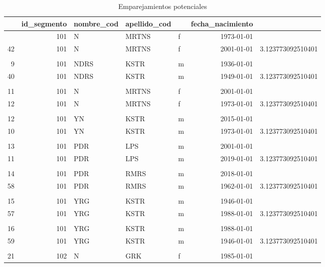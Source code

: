 \documentclass[
  12pt,
]{book}
\begin{document}
\begin{table}[t]
\caption*{
{\fontsize{20}{25}\selectfont  Emparejamientos potenciales\fontsize{12}{15}\selectfont }
} 
\fontsize{12.0pt}{14.0pt}\selectfont
\begin{tabular*}{1\linewidth}{@{\extracolsep{\fill}}rrlllrr}
\toprule
{\bfseries \cellcolor[HTML]{F9F9F9}{id}} & id\_segmento & nombre\_cod & apellido\_cod & {\bfseries \cellcolor[HTML]{F9F9F9}{sexo}} & fecha\_nacimiento & {\bfseries \cellcolor[HTML]{F9F9F9}{Weight}} \\ 
\midrule\addlinespace[2.5pt]
 6 & 101 & N & MRTNS & f & 1973-01-01 &  \\ 
42 & 101 & N & MRTNS & f & 2001-01-01 & 3.123773092510401 \\ 
 &  &  &  &  &  &  \\ 
 9 & 101 & NDRS & KSTR & m & 1936-01-01 &  \\ 
40 & 101 & NDRS & KSTR & m & 1949-01-01 & 3.123773092510401 \\ 
 &  &  &  &  &  &  \\ 
11 & 101 & N & MRTNS & f & 2001-01-01 &  \\ 
12 & 101 & N & MRTNS & f & 1973-01-01 & 3.123773092510401 \\ 
 &  &  &  &  &  &  \\ 
12 & 101 & YN & KSTR & m & 2015-01-01 &  \\ 
10 & 101 & YN & KSTR & m & 1973-01-01 & 3.123773092510401 \\ 
 &  &  &  &  &  &  \\ 
13 & 101 & PDR & LPS & m & 2001-01-01 &  \\ 
11 & 101 & PDR & LPS & m & 2019-01-01 & 3.123773092510401 \\ 
 &  &  &  &  &  &  \\ 
14 & 101 & PDR & RMRS & m & 2018-01-01 &  \\ 
58 & 101 & PDR & RMRS & m & 1962-01-01 & 3.123773092510401 \\ 
 &  &  &  &  &  &  \\ 
15 & 101 & YRG & KSTR & m & 1946-01-01 &  \\ 
57 & 101 & YRG & KSTR & m & 1988-01-01 & 3.123773092510401 \\ 
 &  &  &  &  &  &  \\ 
16 & 101 & YRG & KSTR & m & 1988-01-01 &  \\ 
59 & 101 & YRG & KSTR & m & 1946-01-01 & 3.123773092510401 \\ 
 &  &  &  &  &  &  \\ 
21 & 102 & N & GRK & f & 1985-01-01 &  \\ 

\end{tabular*}
\end{table}
\end{document}
